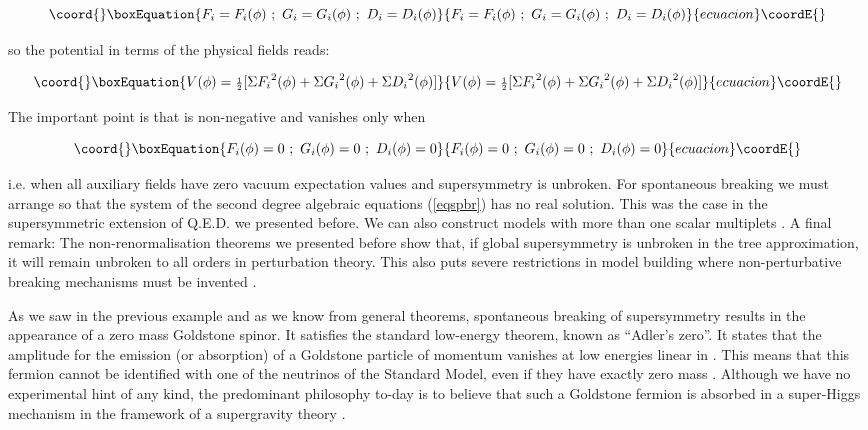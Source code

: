 \documentclass[a4paper,11pt]{article}
\begin{document}
\begin{equation}\coord{}\boxEquation{
\label{auxfields}
F_i=F_i(\phi) \ ; \ G_i=G_i(\phi) \ ; \ D_i=D_i(\phi) 
}{
F_i=F_i(\phi) \ ; \ G_i=G_i(\phi) \ ; \ D_i=D_i(\phi) 
}{ecuacion}\coordE{}\end{equation}
 
\noindent
so the potential in terms of the physical fields reads:


\begin{equation}\coord{}\boxEquation{
\label{phypot}
V(\phi)={\scriptstyle {\frac{1}{2}}}[\Sigma {F_i}^2 (\phi)+\Sigma
{G_i}^2 (\phi)+\Sigma {D_i}^2 (\phi)] 
}{
V(\phi)={\scriptstyle {\frac{1}{2}}}[\Sigma {F_i}^2 (\phi)+\Sigma
{G_i}^2 (\phi)+\Sigma {D_i}^2 (\phi)] 
}{ecuacion}\coordE{}\end{equation}

The important point is that \coordHE{} is non-negative and vanishes only when

\begin{equation}\coord{}\boxEquation{
\label{eqspbr}
F_i(\phi)=0 \ ; \ G_i(\phi)=0 \ ; \ D_i(\phi)=0 
}{
F_i(\phi)=0 \ ; \ G_i(\phi)=0 \ ; \ D_i(\phi)=0 
}{ecuacion}\coordE{}\end{equation}

\noindent
i.e. when all auxiliary fields have zero
vacuum expectation values and supersymmetry is unbroken. For
spontaneous breaking we must arrange so that the system  of the
second degree algebraic equations (\ref{eqspbr}) has no real
solution. This was the case in the supersymmetric extension of
Q.E.D. we presented before. We can also construct models with more
than one scalar multiplets \cite{FO}. A final remark: The
non-renormalisation theorems we presented before show that, if global 
supersymmetry is unbroken in the tree approximation, it will remain
unbroken to all orders in perturbation theory. This also puts severe
restrictions in model building where non-perturbative breaking
mechanisms must be invented \cite{W}.  

As we saw in the previous example and as we know from general theorems,
spontaneous breaking of supersymmetry results in the appearance of a
zero mass Goldstone spinor. It satisfies the standard low-energy
theorem, known as ``Adler's zero''. It states that the amplitude for
the emission (or absorption) of a Goldstone particle of momentum \coordHE{}
vanishes at low energies linear in \coordHE{}. This means that this fermion
cannot be identified with one of the neutrinos of the Standard Model,
even if they have exactly zero mass \cite{WF}. Although we have no experimental
hint of any kind, the predominant philosophy to-day is to believe that
such a Goldstone fermion is absorbed in a super-Higgs mechanism in the
framework of a supergravity theory \cite{VS}.
\end{document}
